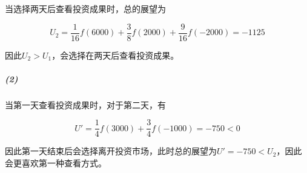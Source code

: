 \documentclass{../notes}
\begin{document}
当选择两天后查看投资成果时，总的展望为

\begin{equation}
    U_2 = \frac {1}{16}f(6000) + \frac 38f(2000) + \frac{9}{16}f(-2000) = -1125
\end{equation}

因此$U_2>U_1$，会选择在两天后查看投资成果。

\subparagraph*{(2)} 当第一天查看投资成果时，对于第二天，有

\begin{equation}
    U' = \frac 14f(3000) + \frac 34f(-1000) = -750 < 0
\end{equation}

因此第一天结束后会选择离开投资市场，此时总的展望为$U' = -750 < U_2$，因此会更喜欢第一种查看方式。
\end{document}
